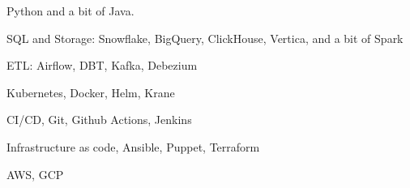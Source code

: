 \item Python and a bit of Java.
\item SQL and Storage: Snowflake, BigQuery, ClickHouse, Vertica, and a bit of
  Spark
\item ETL: Airflow, DBT, Kafka, Debezium
\item Kubernetes, Docker, Helm, Krane
\item CI/CD, Git, Github Actions, Jenkins
\item Infrastructure as code, Ansible, Puppet, Terraform
\item AWS, GCP

